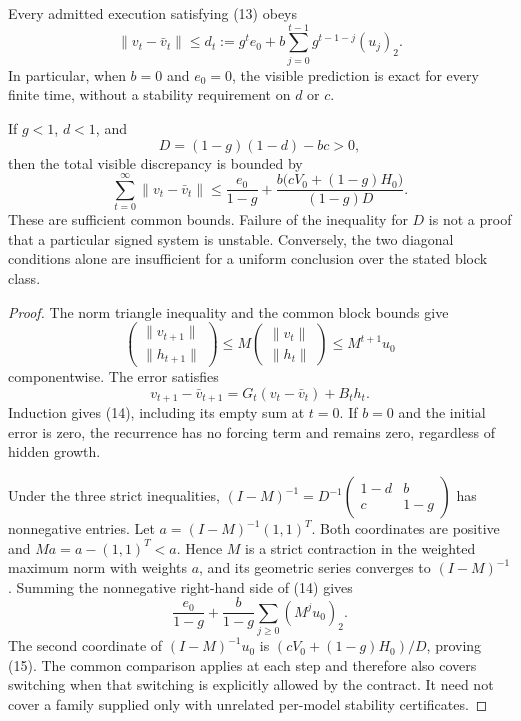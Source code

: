 \begin{GAtheorem}\label{GA:thm:blockleakage}
Every admitted execution satisfying (13) obeys
\[
 \|v_t-\bar v_t\|\le d_t
 :=g^te_0+b\sum_{j=0}^{t-1}g^{t-1-j}(u_j)_2. \tag{14}
\]
In particular, when $b=0$ and $e_0=0$, the visible prediction is exact for every finite time, without a stability requirement on $d$ or $c$.

If $g<1$, $d<1$, and
\[
 D=(1-g)(1-d)-bc>0,
\]
then the total visible discrepancy is bounded by
\[
 \sum_{t=0}^{\infty}\|v_t-\bar v_t\|
 \le \frac{e_0}{1-g}
       +\frac{b\bigl(cV_0+(1-g)H_0\bigr)}{(1-g)D}. \tag{15}
\]
These are sufficient common bounds. Failure of the inequality for $D$ is not a proof that a particular signed system is unstable. Conversely, the two diagonal conditions alone are insufficient for a uniform conclusion over the stated block class.
\end{GAtheorem}
\begin{proof}
The norm triangle inequality and the common block bounds give
\[
 \begin{pmatrix}\|v_{t+1}\|\\\|h_{t+1}\|\end{pmatrix}
 \le M\begin{pmatrix}\|v_t\|\\\|h_t\|\end{pmatrix}
 \le M^{t+1}u_0
\]
componentwise. The error satisfies
\[
 v_{t+1}-\bar v_{t+1}=G_t(v_t-\bar v_t)+B_th_t.
\]
Induction gives (14), including its empty sum at $t=0$. If $b=0$ and the initial error is zero, the recurrence has no forcing term and remains zero, regardless of hidden growth.

Under the three strict inequalities, $(I-M)^{-1}=D^{-1}\begin{pmatrix}1-d&b\\c&1-g\end{pmatrix}$ has nonnegative entries. Let $a=(I-M)^{-1}(1,1)^T$. Both coordinates are positive and $Ma=a-(1,1)^T<a$. Hence $M$ is a strict contraction in the weighted maximum norm with weights $a$, and its geometric series converges to $(I-M)^{-1}$. Summing the nonnegative right-hand side of (14) gives
\[
 \frac{e_0}{1-g}+\frac{b}{1-g}\sum_{j\ge0}(M^ju_0)_2.
\]
The second coordinate of $(I-M)^{-1}u_0$ is $(cV_0+(1-g)H_0)/D$, proving (15). The common comparison applies at each step and therefore also covers switching when that switching is explicitly allowed by the contract. It need not cover a family supplied only with unrelated per-model stability certificates.
\end{proof}


